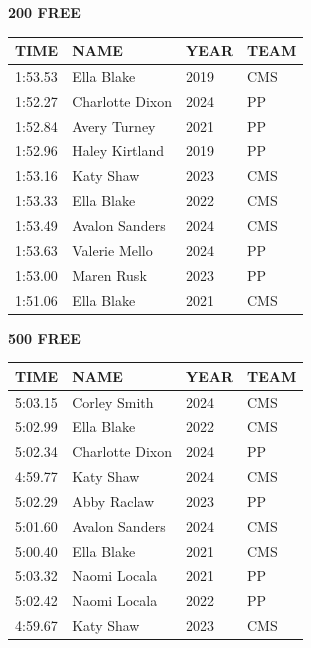 \begin{table}[H]
\centering
\begin{minipage}[t]{0.48\textwidth}
\centering
\textbf{200 FREE}\\[0.1cm]
\begin{tabular}{@{}p{1.8cm}p{2.8cm}p{1.2cm}p{1.4cm}@{}}
\hline
    \textbf{TIME} & \textbf{NAME} & \textbf{YEAR} & \textbf{TEAM} \\
\hline
    1:53.53 & Ella Blake & 2019 & CMS \\
    1:52.27 & Charlotte Dixon & 2024 & PP \\
    1:52.84 & Avery Turney & 2021 & PP \\
    1:52.96 & Haley Kirtland & 2019 & PP \\
    1:53.16 & Katy Shaw & 2023 & CMS \\
    1:53.33 & Ella Blake & 2022 & CMS \\
    1:53.49 & Avalon Sanders & 2024 & CMS \\
    1:53.63 & Valerie Mello & 2024 & PP \\
    1:53.00 & Maren Rusk & 2023 & PP \\
    1:51.06 & Ella Blake & 2021 & CMS \\
\hline
\end{tabular}
\end{minipage}\hfill
\begin{minipage}[t]{0.48\textwidth}
\centering
\textbf{500 FREE}\\[0.1cm]
\begin{tabular}{@{}p{1.8cm}p{2.8cm}p{1.2cm}p{1.4cm}@{}}
\hline
    \textbf{TIME} & \textbf{NAME} & \textbf{YEAR} & \textbf{TEAM} \\
\hline
    5:03.15 & Corley Smith & 2024 & CMS \\
    5:02.99 & Ella Blake & 2022 & CMS \\
    5:02.34 & Charlotte Dixon & 2024 & PP \\
    4:59.77 & Katy Shaw & 2024 & CMS \\
    5:02.29 & Abby Raclaw & 2023 & PP \\
    5:01.60 & Avalon Sanders & 2024 & CMS \\
    5:00.40 & Ella Blake & 2021 & CMS \\
    5:03.32 & Naomi Locala & 2021 & PP \\
    5:02.42 & Naomi Locala & 2022 & PP \\
    4:59.67 & Katy Shaw & 2023 & CMS \\
\hline
\end{tabular}
\end{minipage}
\end{table}

